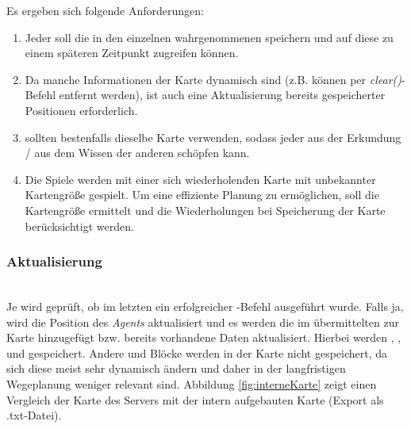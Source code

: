 Es ergeben sich folgende Anforderungen:
\begin{enumerate}
	\item Jeder \Agent soll die in den einzelnen \Steps wahrgenommenen \Things speichern und auf diese zu einem späteren Zeitpunkt zugreifen können. 
	\item Da manche Informationen der Karte dynamisch sind (z.B. können \Obstacles per \textit{clear()}-Befehl entfernt werden), ist auch eine Aktualisierung bereits gespeicherter Positionen erforderlich. 
	\item \Agents sollten bestenfalls dieselbe Karte verwenden, sodass jeder \Agent aus der Erkundung / aus dem Wissen der anderen \Agents schöpfen kann.
	\item Die Spiele werden mit einer sich wiederholenden Karte mit unbekannter Kartengröße gespielt. Um eine effiziente Planung zu ermöglichen, soll die Kartengröße ermittelt und die Wiederholungen bei Speicherung der Karte berücksichtigt werden.
\end{enumerate}


\subsubsection{Aktualisierung} ~\\
Je \Agent wird geprüft, ob im letzten \Step ein erfolgreicher \move-Befehl ausgeführt wurde. Falls ja, wird die Position des \textit{Agents} aktualisiert und es werden die im \Percept übermittelten \Things zur Karte hinzugefügt bzw. bereits vorhandene Daten aktualisiert. Hierbei werden \Dispenser, \GoalZones, \RoleZones und \Obstacles gespeichert. Andere \Agents und Blöcke werden in der Karte nicht gespeichert, da sich diese meist sehr dynamisch ändern und daher in der langfristigen Wegeplanung weniger relevant sind. Abbildung \ref{fig:interneKarte} zeigt einen Vergleich der Karte des Servers mit der intern aufgebauten Karte (Export als .txt-Datei).

